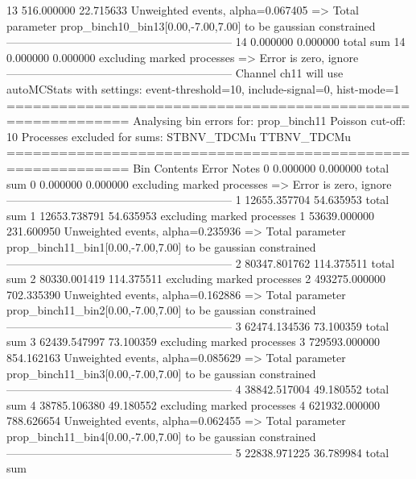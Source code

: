 13         516.000000      22.715633       Unweighted events, alpha=0.067405
  => Total parameter prop_binch10_bin13[0.00,-7.00,7.00] to be gaussian constrained
------------------------------------------------------------
14         0.000000        0.000000        total sum                     
14         0.000000        0.000000        excluding marked processes    
  => Error is zero, ignore      
------------------------------------------------------------
Channel ch11 will use autoMCStats with settings: event-threshold=10, include-signal=0, hist-mode=1
============================================================
Analysing bin errors for: prop_binch11
Poisson cut-off: 10
Processes excluded for sums: STBNV_TDCMu TTBNV_TDCMu
============================================================
Bin        Contents        Error           Notes                         
0          0.000000        0.000000        total sum                     
0          0.000000        0.000000        excluding marked processes    
  => Error is zero, ignore      
------------------------------------------------------------
1          12655.357704    54.635953       total sum                     
1          12653.738791    54.635953       excluding marked processes    
1          53639.000000    231.600950      Unweighted events, alpha=0.235936
  => Total parameter prop_binch11_bin1[0.00,-7.00,7.00] to be gaussian constrained
------------------------------------------------------------
2          80347.801762    114.375511      total sum                     
2          80330.001419    114.375511      excluding marked processes    
2          493275.000000   702.335390      Unweighted events, alpha=0.162886
  => Total parameter prop_binch11_bin2[0.00,-7.00,7.00] to be gaussian constrained
------------------------------------------------------------
3          62474.134536    73.100359       total sum                     
3          62439.547997    73.100359       excluding marked processes    
3          729593.000000   854.162163      Unweighted events, alpha=0.085629
  => Total parameter prop_binch11_bin3[0.00,-7.00,7.00] to be gaussian constrained
------------------------------------------------------------
4          38842.517004    49.180552       total sum                     
4          38785.106380    49.180552       excluding marked processes    
4          621932.000000   788.626654      Unweighted events, alpha=0.062455
  => Total parameter prop_binch11_bin4[0.00,-7.00,7.00] to be gaussian constrained
------------------------------------------------------------
5          22838.971225    36.789984       total sum                     
